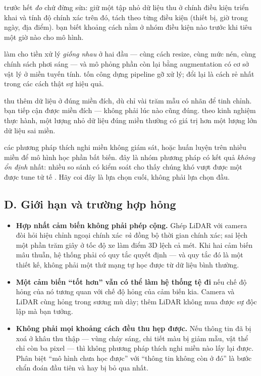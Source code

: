 \documentclass[../../../deep_learning.tex]{subfiles}
\begin{document}
\begin{mach}
\item {} \gp trước hết \emph{đo} chứ đừng sửa: giữ một tập nhỏ dữ liệu thu ở chính điều kiện triển khai và tính độ chính xác trên đó, tách theo từng điều kiện (thiết bị, giờ trong ngày, địa điểm). \hq bạn biết khoảng cách nằm ở nhóm điều kiện nào trước khi tiêu một giờ nào cho mô hình.
\item {} \gp làm cho tiền xử lý \emph{giống nhau} ở hai đầu --- cùng cách resize, cùng mức nén, cùng chính sách phơi sáng --- và mô phỏng phần còn lại bằng augmentation có cơ sở vật lý ở miền tuyến tính. \gia tốn công dựng pipeline gỡ xử lý; đổi lại là cách rẻ nhất trong các cách thật sự hiệu quả.
\item {} \gp thu thêm dữ liệu ở đúng miền đích, dù chỉ vài trăm mẫu có nhãn để tinh chỉnh. \gd bạn tiếp cận được miền đích --- không phải lúc nào cũng đúng. \hq theo kinh nghiệm thực hành, một lượng nhỏ dữ liệu đúng miền thường có giá trị hơn một lượng lớn dữ liệu sai miền.
\item {} \gp các phương pháp thích nghi miền không giám sát, hoặc huấn luyện trên nhiều miền để mô hình học phần bất biến. \gia đây là nhóm phương pháp có kết quả \emph{không ổn định} nhất: nhiều so sánh có kiểm soát cho thấy chúng khó vượt được một  được tune tử tế \cite{gulrajani2021search}. Hãy coi đây là lựa chọn cuối, không phải lựa chọn đầu.
\end{mach}

\subsection{D. Giới hạn và trường hợp hỏng}
\begin{itemize}
\item \textbf{Hợp nhất cảm biến không phải phép cộng.} Ghép LiDAR với camera đòi hỏi hiệu chỉnh ngoại chính xác \emph{và} đồng bộ thời gian chính xác; sai lệch một phần trăm giây ở tốc độ xe làm điểm 3D lệch cả mét. Khi hai cảm biến mâu thuẫn, hệ thống phải có quy tắc quyết định --- và quy tắc đó là một thiết kế, không phải một thứ mạng tự học được từ dữ liệu bình thường.
\item \textbf{Một cảm biến ``tốt hơn'' vẫn có thể làm hệ thống tệ đi} nếu chế độ hỏng của nó tương quan với chế độ hỏng của cảm biến kia. Camera và LiDAR cùng hỏng trong sương mù dày; thêm LiDAR không mua được sự độc lập mà bạn tưởng.
\item \textbf{Không phải mọi khoảng cách đều thu hẹp được.} Nếu thông tin đã bị xoá ở khâu thu thập --- vùng cháy sáng, chi tiết màu bị giảm mẫu, vật thể chỉ còn ba pixel --- thì không phương pháp thích nghi miền nào lấy lại được. Phân biệt ``mô hình chưa học được'' với ``thông tin không còn ở đó'' là bước chẩn đoán đầu tiên và hay bị bỏ qua nhất.
\end{itemize}
\end{document}
